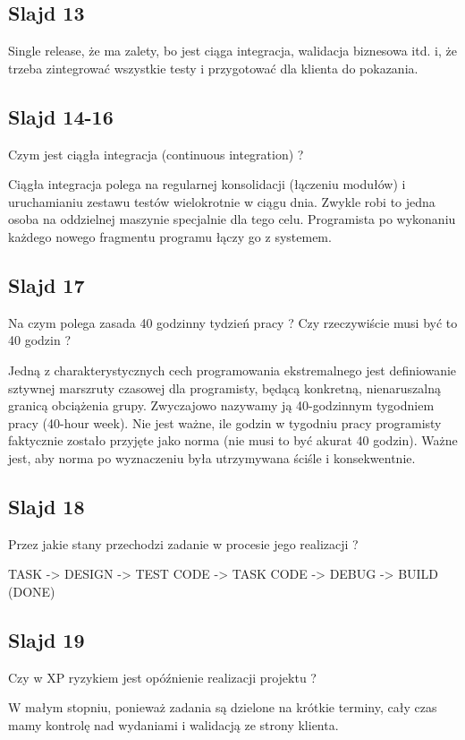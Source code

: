 \documentclass[a4paper,15pt]{article}
\begin{document}
\subsection{Slajd 13}
Single release, że ma zalety, bo jest ciąga integracja, walidacja biznesowa itd. i, że trzeba zintegrować wszystkie testy i przygotować dla klienta do pokazania.

\subsection{Slajd 14-16}

\begin{framed}
Czym jest ciągła integracja (continuous integration) ?
\end{framed}
Ciągła integracja polega na regularnej konsolidacji (łączeniu modułów) i uruchamianiu zestawu testów wielokrotnie w ciągu dnia. Zwykle robi to jedna osoba na oddzielnej maszynie specjalnie dla tego celu. Programista po wykonaniu każdego nowego fragmentu programu łączy go z systemem.

\subsection{Slajd 17}
\begin{framed}
Na czym polega zasada 40 godzinny tydzień pracy ? Czy rzeczywiście musi być to 40 godzin ?
\end{framed}
Jedną z charakterystycznych cech programowania ekstremalnego jest definiowanie sztywnej marszruty czasowej dla programisty, będącą konkretną, nienaruszalną granicą obciążenia grupy. Zwyczajowo nazywamy ją 40-godzinnym tygodniem pracy (40-hour week). Nie jest ważne, ile godzin w tygodniu pracy programisty faktycznie zostało przyjęte jako norma (nie musi to być akurat 40 godzin). Ważne jest, aby norma po wyznaczeniu była utrzymywana ściśle i konsekwentnie. 


\subsection{Slajd 18}
\begin{framed}
Przez jakie stany przechodzi zadanie w procesie jego realizacji ?
\end{framed}
TASK -> DESIGN -> TEST CODE -> TASK CODE -> DEBUG -> BUILD (DONE)

\subsection{Slajd 19}
\begin{framed}
Czy w XP ryzykiem jest opóźnienie realizacji projektu ?
\end{framed}
W małym stopniu, ponieważ zadania są dzielone na krótkie terminy, cały czas mamy kontrolę nad wydaniami i walidacją ze strony klienta.
\end{document}
